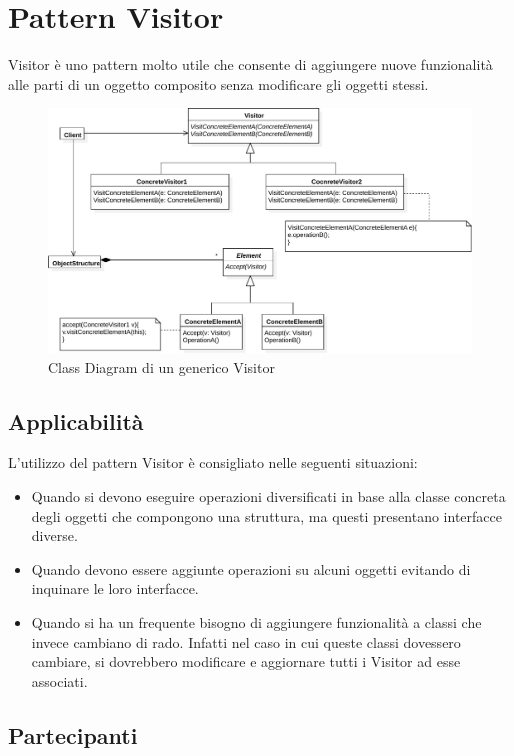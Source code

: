 \section{Pattern Visitor}
\label{sec:visitor}

Visitor è uno pattern molto utile che consente di aggiungere nuove funzionalità alle parti di un oggetto composito senza modificare gli oggetti stessi.
\begin{figure}[htbp]
\centering
\includegraphics[width=\textwidth,height=\textheight,keepaspectratio]{images/visitor-design-pattern.pdf}
\caption{Class Diagram di un generico Visitor}
\label{fig:visitor-design-pattern}
\end{figure}

\subsection{Applicabilità}
L'utilizzo del pattern Visitor è consigliato nelle seguenti situazioni:
\begin{itemize}
\item Quando si devono eseguire operazioni diversificati in base alla classe concreta degli oggetti che compongono una struttura, ma questi presentano interfacce diverse.
\item Quando devono essere aggiunte operazioni su alcuni oggetti evitando di inquinare le loro interfacce.
\item Quando si ha un frequente bisogno di aggiungere funzionalità a classi che invece cambiano di rado. Infatti nel caso in cui queste classi dovessero cambiare, si dovrebbero modificare e aggiornare tutti i Visitor ad esse associati.
\end{itemize}

\subsection{Partecipanti}

